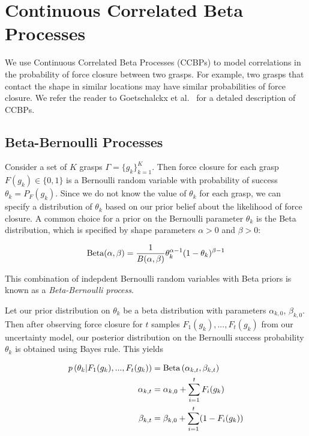 \section{Continuous Correlated Beta Processes}

We use Continuous Correlated Beta Processes (CCBPs) to model correlations in the probability of force closure between two grasps.
For example, two grasps that contact the shape in similar locations may have similar probabilities of force closure.
We refer the reader to Goetschalckx et al.~\cite{} for a detaled description of CCBPs.

\subsection{Beta-Bernoulli Processes}

Consider a set of $K$ grasps $\Gamma = \{g_k\}_{k=1}^K$.
Then force closure for each grasp $F(g_k) \in \{0, 1\}$ is a Bernoulli random variable with probability of success $\theta_k = P_F(g_k)$.
Since we do not know the value of $\theta_k$ for each grasp, we can specify a distribution of $\theta_k$ based on our prior belief about the likelihood of force closure.
A common choice for a prior on the Bernoulli parameter $\theta_k$ is the Beta distribution, which is specified by shape parameters $\alpha > 0$ and $\beta > 0$:

\vspace{-2ex}
\begin{align*}
	\text{Beta}(\alpha, \beta) = \frac{1}{B(\alpha, \beta)} \theta_k^{\alpha-1} (1 - \theta_k)^{\beta-1}
\end{align*}

\noindent This combination of indepdent Bernoulli random variables with Beta priors is known as a {\it Beta-Bernoulli process}.

Let our prior distribution on $\theta_k$ be a beta distribution with parameters $\alpha_{k,0}$, $\beta_{k,0}$.
Then after observing force closure for $t$ samples $F_{1}(g_k), ..., F_{t}(g_k)$ from our uncertainty model, our posterior distribution on the Bernoulli success probability $\theta_k$ is obtained using Bayes rule.
This yields~\cite{laskey2015bandits}

\vspace{-2ex}
\begin{align*}
	p \left(\theta_k | F_{1}(g_k), ..., F_{t}(g_k) \right) &= \text{Beta}\left( \alpha_{k,t}, \beta_{k,t} \right) \\
	\alpha_{k,t} &= \alpha_{k,0} + \sum \limits_{i=1}^t F_{i}(g_k) \\
	\beta_{k,t} &= \beta_{k,0} + \sum \limits_{i=1}^t (1 - F_{i}(g_k))
\end{align*}

